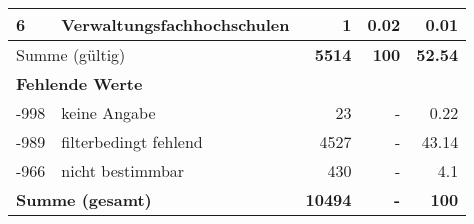 \begin{longtable}{lXrrr}
     6 &
     \multicolumn{1}{X}{ Verwaltungsfachhochschulen   } &


       \num{1} &
       \num[round-mode=places,round-precision=2]{0,02} &
         \num[round-mode=places,round-precision=2]{0,01} \\
     \midrule
     \multicolumn{2}{l}{Summe (gültig)} &
       \textbf{\num{5514}} &
     \textbf{100} &
       \textbf{\num[round-mode=places,round-precision=2]{52,54}} \\
     \multicolumn{5}{l}{\textbf{Fehlende Werte}}\\
       -998 &
       keine Angabe &
         \num{23} &
        - &
         \num[round-mode=places,round-precision=2]{0,22} \\
       -989 &
       filterbedingt fehlend &
         \num{4527} &
        - &
         \num[round-mode=places,round-precision=2]{43,14} \\
       -966 &
       nicht bestimmbar &
         \num{430} &
        - &
         \num[round-mode=places,round-precision=2]{4,1} \\
     \midrule
     \multicolumn{2}{l}{\textbf{Summe (gesamt)}} &
          \textbf{\num{10494}} &
        \textbf{-} &
        \textbf{100} \\
     \bottomrule
     \end{longtable}
     
